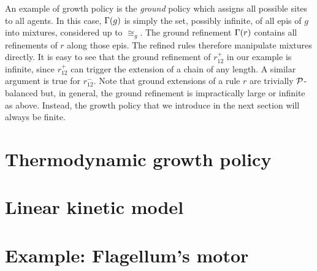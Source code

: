 An example of growth policy is the \emph{ground} policy
which assigns all possible sites to all agents.
In this case, $\Gamma(g)$ is simply the set, possibly infinite,
of all epis of $g$ into mixtures, considered up to $\cong_g$.
The ground refinement $\Gamma(r)$ %
contains all refinements of $r$ along those epis.
The refined rules therefore manipulate mixtures directly.
It is easy to see that the ground refinement of $r^+_{12}$
in our example is infinite,
since $r^+_{12}$ %
can trigger the extension of a chain of any length.
A similar argument is true for $r^-_{12}$.
Note that ground extensions of a rule $r$
are trivially $\mathcal{P}$-balanced but, in general,
the ground refinement is impractically large or infinite as above.
Instead, the growth policy that we introduce
in the next section %
will always be finite.


\section{Thermodynamic growth policy} %
\label{sec:energy-gp}




\section{Linear kinetic model}
\label{sec:kinetic-model}

%
%


\section{Example: Flagellum's motor}
\label{sec:alloring}




